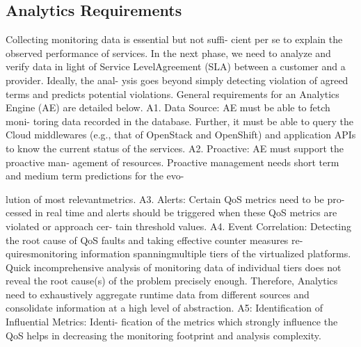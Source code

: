 \subsection{Analytics Requirements}

Collecting monitoring data is essential but not suffi- cient per se to explain the observed performance of services. In the next phase, we need to analyze and verify data in light of Service LevelAgreement (SLA) between a customer and a provider. Ideally, the anal- ysis goes beyond simply detecting violation of agreed terms and predicts potential violations. General requirements for an Analytics Engine
(AE) are detailed below. A1. Data Source: AE must be able to fetch moni- toring data recorded in the database. Further, it must be able to query the Cloud middlewares (e.g., that of OpenStack and OpenShift) and application APIs to know the current status of the services. A2. Proactive: AE must support the proactive man- agement of resources. Proactive management needs short term and medium term predictions for the evo-

lution of most relevantmetrics. A3. Alerts: Certain QoS metrics need to be pro- cessed in real time and alerts should be triggered when these QoS metrics are violated or approach cer- tain threshold values. A4. Event Correlation: Detecting the root cause of QoS faults and taking effective counter measures re- quiresmonitoring information spanningmultiple tiers of the virtualized platforms. Quick incomprehensive analysis of monitoring data of individual tiers does not reveal the root cause(s) of the problem precisely enough. Therefore, Analytics need to exhaustively aggregate runtime data from different sources and consolidate information at a high level of abstraction. A5: Identification of Influential Metrics: Identi- fication of the metrics which strongly influence the QoS helps in decreasing the monitoring footprint and analysis complexity.

